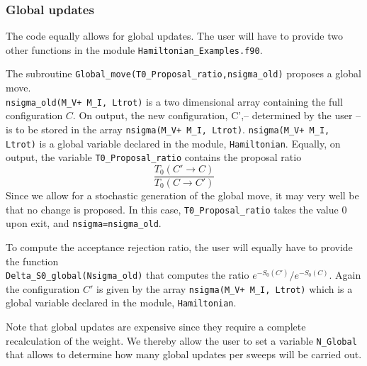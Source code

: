 \subsubsection{Global updates}
%  
The code equally allows for global updates.  The user will have to provide two other functions in the module \texttt{Hamiltonian\_Examples.f90}.   

The subroutine  \texttt{Global\_move(T0\_Proposal\_ratio,nsigma\_old)}  proposes  a global move. \\
\texttt{nsigma\_old(M\_V+ M\_I, Ltrot)} is a two dimensional  array containing  the full  configuration $C$.  On output, the new configuration, C',-- determined by the user -- is to be stored in the 
array  \texttt{nsigma(M\_V+ M\_I, Ltrot)}.    \texttt{nsigma(M\_V+ M\_I, Ltrot)} is a global variable declared in the module, \texttt{Hamiltonian}.  Equally, on output, the variable 
\texttt{T0\_Proposal\_ratio} contains the proposal ratio 
\begin{equation}
	 \frac{T_0(C' \rightarrow C)}{T_0(C \rightarrow C') }  
\end{equation}
Since we allow for a stochastic  generation of  the global move, it may very well be that no change is proposed. In this case, \texttt{T0\_Proposal\_ratio}   takes the value 0 upon exit, and  
\texttt{nsigma=nsigma\_old}.   

To compute the acceptance rejection ratio,  the user  will equally have to provide the function \\
\texttt{Delta\_S0\_global(Nsigma\_old)} that computes the ratio $e^{-S_0(C')}/e^{-S_0(C)}$. Again the configuration $C'$ is   given by the array \texttt{nsigma(M\_V+ M\_I, Ltrot)}  which is 
a global variable declared in the module, \texttt{Hamiltonian}.

Note that global updates are expensive since they require a complete recalculation of the weight. We thereby  allow the user to set a variable \texttt{N\_Global} that allows to  determine how many global updates per sweeps will be carried out. 
% 
